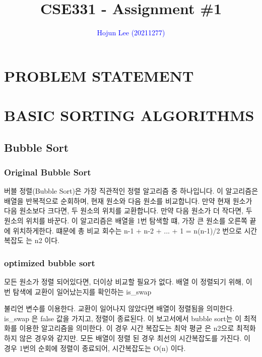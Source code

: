 \documentclass[sigconf]{acmart}
\begin{document}
\title{CSE331 - Assignment \#1}

\author{\textcolor{blue}{Hojun Lee (20211277)}}

\renewcommand{\shortauthors}{\textcolor{blue}{Kim et al.}}

\renewcommand\footnotetextcopyrightpermission[1]{} %

\maketitle

\section{PROBLEM STATEMENT}
\section{BASIC SORTING ALGORITHMS}
\subsection{Bubble Sort}
\subsubsection{Original Bubble Sort}

버블 정렬(Bubble Sort)은 가장 직관적인 정렬 알고리즘 중 하나입니다. 이 알고리즘은 배열을 반복적으로 순회하며, 현재 원소와 다음 원소를 비교합니다. 만약 현재 원소가 다음 원소보다 크다면, 두 원소의 위치를 교환합니다. 만약 다음 원소가 더 작다면, 두 원소의 위치를 바꾼다. 이 알고리즘은 배열을 1번 탐색할 떄, 가장 큰 원소를 오른쪽 끝에 위치하게한다. 떄문에 총 비교 회수는 n-1 + n-2 + ... + 1 = n(n-1)/2 번으로 시간복잡도 는 n2 이다.

\subsubsection{optimized bubble sort}
모든 원소가 정렬 되어있다면, 더이상 비교할 필요가 없다.
배열 이 정렬되기 위해, 이번 탐색에 교환이 일어났는지를 확인하는
is\_swap 

불리언 변수를 이용한다.
교환이 일어나지 않았다면 배열이 정렬됨을 의미한다.
is\_swap 은 false 값을 가지고, 정렬이 종료된다.
이 보고서에서 bubble sort는 이 최적화를 이용한 알고리즘을 의미한다.
이 경우 시간 복잡도는 최악 평균 은 n2으로 최적화 하지 않은 경우와 같지만.
모든 배열이 정렬 된 경우 최선의 시간복잡도를 가진다.
이 경우 1번의 순회에 정렬이 종료되어, 시간복잡도는 O(n) 이다.
\end{document}
